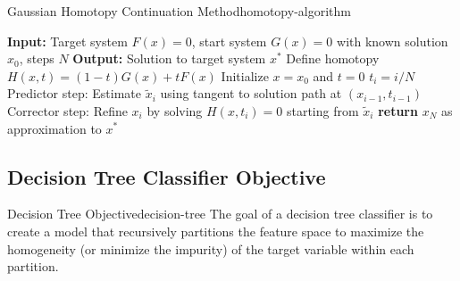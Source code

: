 \documentclass[12pt]{article}
\begin{document}
\begin{algorithmenv}{Gaussian Homotopy Continuation Method}{homotopy-algorithm}
\begin{algorithmic}[1]
\State \textbf{Input:} Target system $F(x) = 0$, start system $G(x) = 0$ with known solution $x_0$, steps $N$
\State \textbf{Output:} Solution to target system $x^*$
\State Define homotopy $H(x, t) = (1-t)G(x) + tF(x)$
\State Initialize $x = x_0$ and $t = 0$
    \State $t_i = i/N$
    \State Predictor step: Estimate $\tilde{x}_i$ using tangent to solution path at $(x_{i-1}, t_{i-1})$
    \State Corrector step: Refine $x_i$ by solving $H(x, t_i) = 0$ starting from $\tilde{x}_i$
\EndFor
\State \textbf{return} $x_N$ as approximation to $x^*$
\end{algorithmic}
\end{algorithmenv}

\subsection{Decision Tree Classifier Objective}

\begin{definition}{Decision Tree Objective}{decision-tree}
The goal of a decision tree classifier is to create a model that recursively partitions the feature space to maximize the homogeneity (or minimize the impurity) of the target variable within each partition.
\end{definition}
\end{document}

